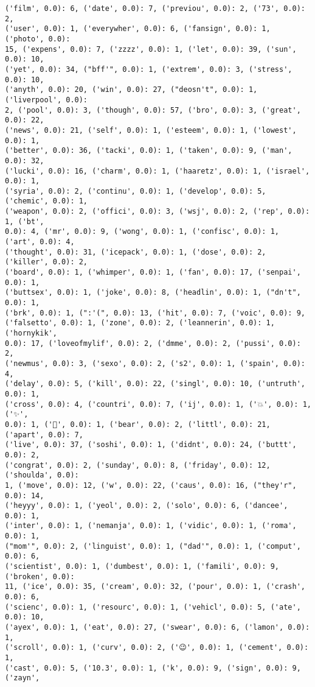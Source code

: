 \documentclass[11pt]{article}
\begin{document}
\begin{Verbatim}[commandchars=\\\{\}]
('film', 0.0): 6, ('date', 0.0): 7, ('previou', 0.0): 2, ('73', 0.0): 2,
('user', 0.0): 1, ('everywher', 0.0): 6, ('fansign', 0.0): 1, ('photo', 0.0):
15, ('expens', 0.0): 7, ('zzzz', 0.0): 1, ('let', 0.0): 39, ('sun', 0.0): 10,
('yet', 0.0): 34, ("bff'", 0.0): 1, ('extrem', 0.0): 3, ('stress', 0.0): 10,
('anyth', 0.0): 20, ('win', 0.0): 27, ("deosn't", 0.0): 1, ('liverpool', 0.0):
2, ('pool', 0.0): 3, ('though', 0.0): 57, ('bro', 0.0): 3, ('great', 0.0): 22,
('news', 0.0): 21, ('self', 0.0): 1, ('esteem', 0.0): 1, ('lowest', 0.0): 1,
('better', 0.0): 36, ('tacki', 0.0): 1, ('taken', 0.0): 9, ('man', 0.0): 32,
('lucki', 0.0): 16, ('charm', 0.0): 1, ('haaretz', 0.0): 1, ('israel', 0.0): 1,
('syria', 0.0): 2, ('continu', 0.0): 1, ('develop', 0.0): 5, ('chemic', 0.0): 1,
('weapon', 0.0): 2, ('offici', 0.0): 3, ('wsj', 0.0): 2, ('rep', 0.0): 1, ('bt',
0.0): 4, ('mr', 0.0): 9, ('wong', 0.0): 1, ('confisc', 0.0): 1, ('art', 0.0): 4,
('thought', 0.0): 31, ('icepack', 0.0): 1, ('dose', 0.0): 2, ('killer', 0.0): 2,
('board', 0.0): 1, ('whimper', 0.0): 1, ('fan', 0.0): 17, ('senpai', 0.0): 1,
('buttsex', 0.0): 1, ('joke', 0.0): 8, ('headlin', 0.0): 1, ("dn't", 0.0): 1,
('brk', 0.0): 1, (":'(", 0.0): 13, ('hit', 0.0): 7, ('voic', 0.0): 9,
('falsetto', 0.0): 1, ('zone', 0.0): 2, ('leannerin', 0.0): 1, ('hornykik',
0.0): 17, ('loveofmylif', 0.0): 2, ('dmme', 0.0): 2, ('pussi', 0.0): 2,
('newmus', 0.0): 3, ('sexo', 0.0): 2, ('s2', 0.0): 1, ('spain', 0.0): 4,
('delay', 0.0): 5, ('kill', 0.0): 22, ('singl', 0.0): 10, ('untruth', 0.0): 1,
('cross', 0.0): 4, ('countri', 0.0): 7, ('ij', 0.0): 1, ('💥', 0.0): 1, ('✨',
0.0): 1, ('💫', 0.0): 1, ('bear', 0.0): 2, ('littl', 0.0): 21, ('apart', 0.0): 7,
('live', 0.0): 37, ('soshi', 0.0): 1, ('didnt', 0.0): 24, ('buttt', 0.0): 2,
('congrat', 0.0): 2, ('sunday', 0.0): 8, ('friday', 0.0): 12, ('shoulda', 0.0):
1, ('move', 0.0): 12, ('w', 0.0): 22, ('caus', 0.0): 16, ("they'r", 0.0): 14,
('heyyy', 0.0): 1, ('yeol', 0.0): 2, ('solo', 0.0): 6, ('dancee', 0.0): 1,
('inter', 0.0): 1, ('nemanja', 0.0): 1, ('vidic', 0.0): 1, ('roma', 0.0): 1,
("mom'", 0.0): 2, ('linguist', 0.0): 1, ("dad'", 0.0): 1, ('comput', 0.0): 6,
('scientist', 0.0): 1, ('dumbest', 0.0): 1, ('famili', 0.0): 9, ('broken', 0.0):
11, ('ice', 0.0): 35, ('cream', 0.0): 32, ('pour', 0.0): 1, ('crash', 0.0): 6,
('scienc', 0.0): 1, ('resourc', 0.0): 1, ('vehicl', 0.0): 5, ('ate', 0.0): 10,
('ayex', 0.0): 1, ('eat', 0.0): 27, ('swear', 0.0): 6, ('lamon', 0.0): 1,
('scroll', 0.0): 1, ('curv', 0.0): 2, ('😉', 0.0): 1, ('cement', 0.0): 1,
('cast', 0.0): 5, ('10.3', 0.0): 1, ('k', 0.0): 9, ('sign', 0.0): 9, ('zayn',

\end{Verbatim}
\end{document}
